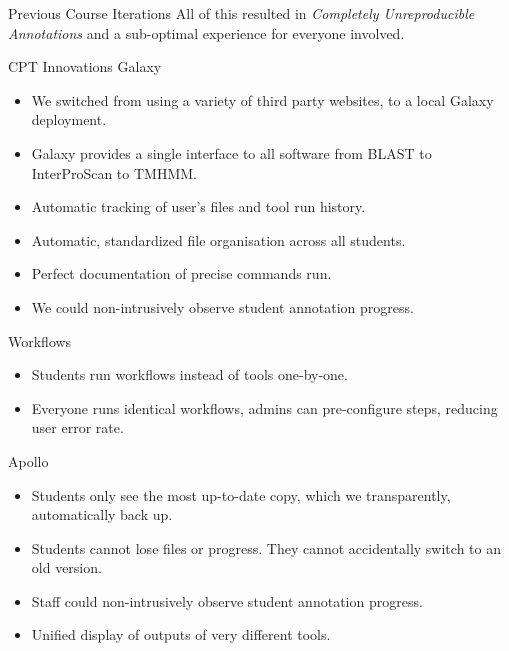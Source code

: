 \documentclass[final,t,20pt]{beamer}
\begin{document}
\begin{frame}[fragile]
\begin{columns}[t]
\begin{column}{.36\linewidth}
\begin{block}{Previous Course Iterations}
                All of this resulted in \emph{Completely Unreproducible Annotations} and a sub-optimal experience for everyone involved.
            \end{block}

            \begin{block}{CPT Innovations}
                Galaxy
                \begin{itemize}
                    \item We switched from using a variety of third party
                        websites, to a local Galaxy deployment.
                    \item Galaxy provides a single interface to all software
                        from BLAST to InterProScan to TMHMM.
                    \item Automatic tracking of user's files and tool run history.
                    \item Automatic, standardized file organisation across all students.
                    \item Perfect documentation of precise commands run.
                    \item We could non-intrusively observe student annotation
                        progress.
                \end{itemize}
                Workflows
                \begin{itemize}
                    \item Students run workflows instead of tools one-by-one.
                    \item Everyone runs identical workflows, admins can
                        pre-configure steps, reducing user error rate.
                \end{itemize}
                Apollo
                \begin{itemize}
                    \item Students only see the most up-to-date copy, which we
                        transparently, automatically back up.
                    \item Students cannot lose files or progress. They cannot
                        accidentally switch to an old version.
                    \item Staff could non-intrusively observe student
                        annotation progress.
                    \item Unified display of outputs of very different tools.
                \end{itemize}
            \end{block}


\end{column}
\end{columns}
\end{frame}
\end{document}
